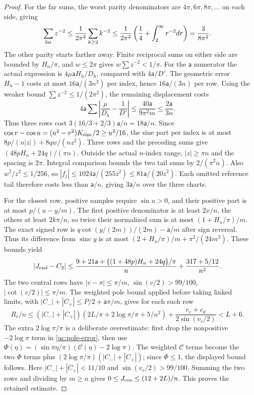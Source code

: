 \begin{proof}
For the far sums, the worst parity denominators are
$4\pi,6\pi,8\pi,\ldots$ on each side, giving
\[
 \sum_{\rm far}z^{-2}
 \leq\frac1{2\pi^2}\sum_{k\geq2}k^{-2}
 \leq\frac1{2\pi^2}\left(\frac14+\int_2^\infty r^{-2}dr\right)
 =\frac3{8\pi^2}.
\]
The other parity starts farther away. Finite reciprocal sums on either
side are bounded by $H_n/\pi$, and $w\leq2\pi$ gives
$w\sum z^{-2}<1/\pi$. For the $\mathsf{a}$ numerator the actual expression
is $4\mu \mathsf{a}H_h/D_h$, compared with $4\mathsf{a}/D'$. The geometric error
$H_h-1$ costs at most $16\mathsf{a}/(3n^2)$ per index, hence
$16\mathsf{a}/(3n)$ per row. Using the weaker bound
$\sum z^{-2}\leq1/(2\pi^2)$, the remaining displacement costs
\[
 4\mathsf{a}\sum\left|\frac\mu{D_h}-\frac1{D'}\right|
 \leq\frac{40\mathsf{a}}{9\pi^2m}\leq\frac{2\mathsf{a}}{3n}.
\]
Thus three rows cost $3(16/3+2/3)\mathsf{a}/n=18\mathsf{a}/n$.
Since $\cos v-\cos u=(u^2-v^2)K_{\rm sinc}/2\geq u^2/16$,
the sine part per index is at most
$8p/(n|z|)+8qw/(nz^2)$. Three rows and the preceding sums give
$(48pH_n+24q)/(\pi n)$.
Outside the actual $n$-index range, $|z|\geq\pi n$ and the spacing
is $2\pi$. Integral comparison bounds the two tail sums by
$2/(\pi^2n)$. Also $w^2/z^2\leq1/256$, so
$|f_j|\leq1024\mathsf{a}/(255z^2)\leq81\mathsf{a}/(20z^2)$.
Each omitted reference tail therefore costs less than $\mathsf{a}/n$, giving
$3\mathsf{a}/n$ over the three charts.

For the closest row, positive samples require $\sin u>0$, and their
positive part is at most $p/(u-y/m)$. The first positive denominator
is at least $2x/n$, the others at least $2k\pi/n$, so twice their
normalized sum is at most $(1+H_n/\pi)/m$.
The exact signed row is $q\cot(y/(2m))/(2m)-\mathsf{a}/m$ after sign reversal.
Thus its difference from $\operatorname{sinc}y$ is at most
$(2+H_n/\pi)/m+\pi^2/(24m^2)$.
These bounds yield
\[
 |J_{\rm end}-C_2|\leq
 \frac{9+21\mathsf{a}+\{(1+48p)H_n+24q\}/\pi}{n}
                  +\frac{317+5/12}{n^2}.
\]
The two central rows have $|v-\pi|\leq\pi/m$,
$\sin(v/2)>99/100$, $|\cot(v/2)|\leq\pi/m$.
The weighted pole bound applied before taking linked limits, with
$|C_-|+|C_+|\leq P/2+\mathsf{a}\pi/m$, gives for each such row
\[
 R_r/n\leq(|C_-|+|C_+|)(2L/\pi+2\log\pi/\pi+5/n^2)
                   +\frac{c_e+c_d}{2\sin(v_r/2)}<L+6.
\]
The extra $2\log\pi/\pi$ is a deliberate overestimate: first drop
the nonpositive $-2\log\pi$ term in \eqref{uc:pole-error}, then use
$\Phi(\eta)=(\sin\pi\eta/\pi)(\mathcal C(\eta)-2\log\pi)$.
The weighted $\mathcal C$ terms become the two $\Phi$ terms plus
$(2\log\pi/\pi)(|C_-|+|C_+|)$; since $\Phi\leq1$, the displayed
bound follows. Here $|C_-|+|C_+|<11/10$ and
$\sin(v_r/2)>99/100$.
Summing the two rows and dividing by $m\geq n$ gives
$0\leq J_{\rm cen}\leq(12+2L)/n$. This proves the retained estimate.


\end{proof}
